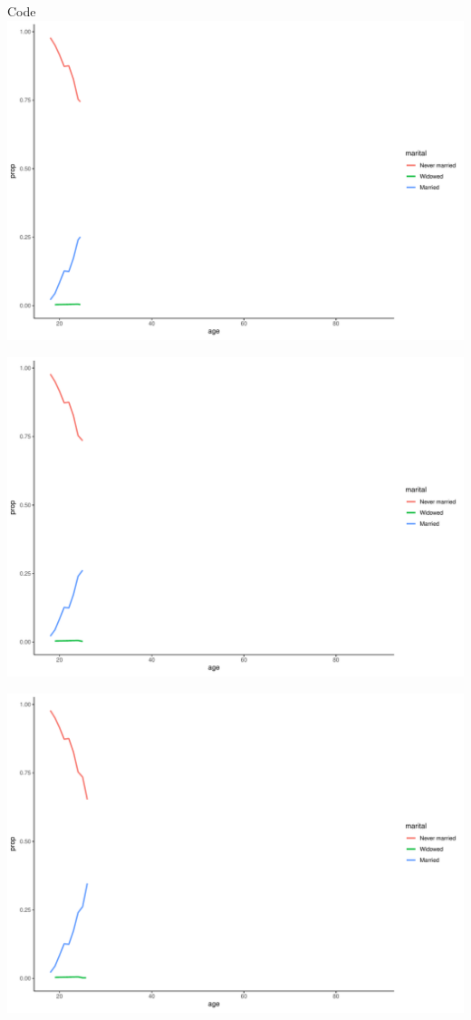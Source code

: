 \documentclass[
  ignorenonframetext,
]{beamer}
\begin{document}
\begin{frame}[fragile]{Code}
\includegraphics{gss_cat_files/figure-beamer/unnamed-chunk-1-14.pdf}

\includegraphics{gss_cat_files/figure-beamer/unnamed-chunk-1-15.pdf}

\includegraphics{gss_cat_files/figure-beamer/unnamed-chunk-1-16.pdf}


\end{frame}
\end{document}
